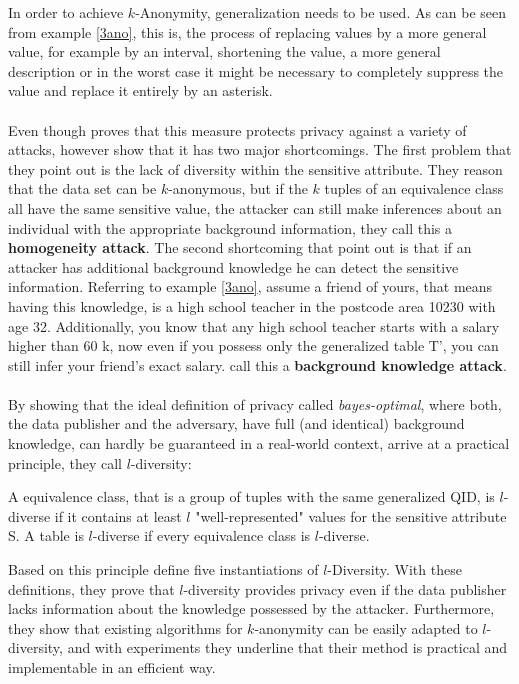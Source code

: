 \noindent In order to achieve $k$-Anonymity, generalization needs to be used. As can be seen from example \ref{3ano}, this is, the process of replacing values by a more general value, for example by an interval, shortening the value, a more general description or in the worst case it might be necessary to completely suppress the value and replace it entirely by an asterisk. \\
\\
Even though  proves that this measure protects privacy against a variety of attacks, however  show that it has two major shortcomings. The first problem that they point out is the lack of diversity within the sensitive attribute. They reason that the data set can be $k$-anonymous, but if the $k$ tuples of an equivalence class all have the same sensitive value, the attacker can still make inferences about an individual with the appropriate background information, they call this a \textbf{homogeneity attack}. The second shortcoming that  point out is that if an attacker has additional background knowledge he can detect the sensitive information. Referring to example \ref{3ano}, assume a friend of yours, that means having this knowledge, is a high school teacher in the postcode area 10230 with age 32. Additionally, you know that any high school teacher starts with a salary higher than 60 k, now even if you possess only the generalized table T', you can still infer your friend's exact salary.  call this a \textbf{background knowledge attack}.\\
\\
By showing that the ideal definition of privacy called \textit{bayes-optimal}, where both, the data publisher and the adversary, have full (and identical) background knowledge, can hardly be guaranteed in a real-world context,  arrive at a practical principle, they call $l$-diversity:

\begin{definition}
A equivalence class, that is a group of tuples with the same generalized QID, is $l$-diverse if it contains at least $l$ "well-represented" values for the sensitive attribute S. A table is $l$-diverse if every equivalence class is $l$-diverse. \cite{ldiversity2006}
\end{definition}

\noindent Based on this principle  define five instantiations of $l$-Diversity. With these definitions, they prove that $l$-diversity provides privacy even if the data publisher lacks information about the knowledge possessed by the attacker. Furthermore, they show that existing algorithms for $k$-anonymity can be easily adapted to $l$-diversity, and with experiments they underline that their method is practical and implementable in an efficient way.

